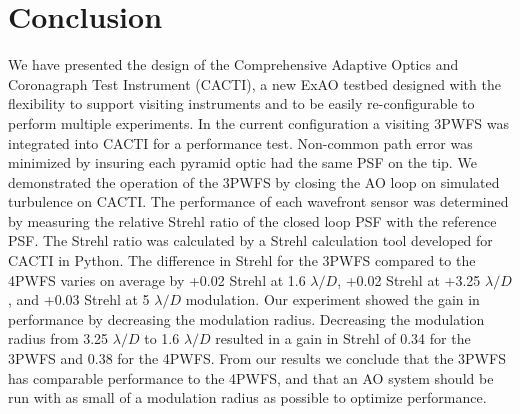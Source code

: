 


\section{Conclusion}

We have presented the design of the Comprehensive Adaptive Optics and Coronagraph Test Instrument (CACTI), a new ExAO testbed designed with the flexibility to support visiting instruments and to be easily re-configurable to perform multiple experiments. In the current configuration a visiting 3PWFS was integrated into CACTI for a performance test. Non-common path error was minimized by insuring each pyramid optic had the same PSF on the tip. We demonstrated the operation of the 3PWFS by closing the AO loop on simulated turbulence on CACTI. The performance of each wavefront sensor was determined by measuring the relative Strehl ratio of the closed loop PSF with the reference PSF. The Strehl ratio was calculated by a Strehl calculation tool developed for CACTI in Python.  The difference in Strehl for the 3PWFS compared to the 4PWFS varies on average by +0.02 Strehl at 1.6 $\lambda/D$, +0.02 Strehl at +3.25 $\lambda/D$, and +0.03 Strehl at 5 $\lambda/D$ modulation. Our experiment showed the gain in performance by decreasing the modulation radius. Decreasing the modulation radius from 3.25 $\lambda/D$ to  1.6 $\lambda/D$ resulted in a gain in Strehl of 0.34 for the 3PWFS and 0.38 for the 4PWFS. From our results we conclude that the 3PWFS has comparable performance to the 4PWFS, and that an AO system should be run with as small of a modulation radius as possible to optimize performance. 






